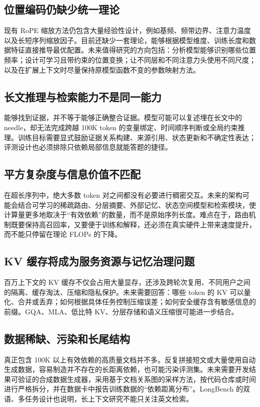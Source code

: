\documentclass[UTF8,10pt,a4paper,fontset=none]{ctexart}
\begin{document}
\subsection{位置编码仍缺少统一理论}
现有 RoPE 缩放方法仍包含大量经验性设计，例如基频、频带边界、注意力温度以及长短序列缩放因子。目前还缺少一套理论，能够根据模型维度、训练长度和数据特征直接推导最优配置。未来值得研究的方向包括：分析模型能够识别哪些位置频率；设计可学习且带约束的位置变换；让不同层和不同注意力头使用不同尺度；以及在扩展上下文时尽量保持原模型函数不变的参数映射方法。

\subsection{长文推理与检索能力不是同一能力}
能够找到证据，并不等于能够正确整合证据。模型可能可以复述埋在长文中的 needle，却无法完成跨越 100K token 的变量绑定、时间顺序判断或全局约束推理。训练目标需要显式鼓励证据关系构建、来源引用、状态更新和不确定性表达；评测设计也必须排除只依赖局部信息就能答题的捷径。

\subsection{平方复杂度与信息价值不匹配}
在超长序列中，绝大多数 token 对之间都没有必要进行稠密交互。未来的架构可能会结合可学习的稀疏路由、分层摘要、外部记忆、状态空间模型和检索模块，使计算量更多地取决于“有效依赖”的数量，而不是原始序列长度。难点在于，路由机制既要保持高召回率，又要便于训练和解释，还必须在真实硬件上带来速度提升，而不能只停留在理论 FLOPs 的下降。

\subsection{KV 缓存将成为服务资源与记忆治理问题}
百万上下文的 KV 缓存不仅会占用大量显存，还涉及跨轮次复用、不同用户之间的隔离、缓存淘汰、压缩和隐私保护。未来需要回答：哪些 token 的 KV 可以量化、合并或丢弃；如何根据具体任务控制压缩误差；如何安全缓存含有敏感信息的前缀。GQA、MLA、低比特 KV、分层存储和语义压缩很可能进一步结合。

\subsection{数据稀缺、污染和长尾结构}
真正包含 100K 以上有效依赖的高质量文档并不多。反复拼接短文或大量使用自动生成数据，容易制造并不存在的长距离依赖，也可能污染评测集。未来需要开发结果可验证的合成数据生成器，采用基于文档关系图的采样方法，按代码仓库或时间进行严格拆分，并在数据卡中报告训练数据的“依赖距离分布”。LongBench 的双语、多任务设计\cite{bai2023longbench}也说明，长上下文研究不能只关注英文检索。
\end{document}
